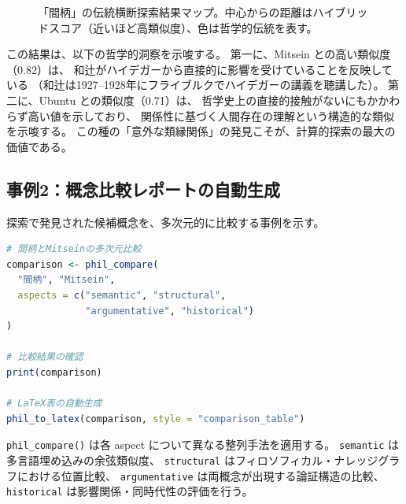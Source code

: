 \documentclass[a4paper,11pt]{ltjsarticle}
\begin{document}
\begin{figure}[H]
\caption{「間柄」の伝統横断探索結果マップ。中心からの距離はハイブリッドスコア（近いほど高類似度）、色は哲学的伝統を表す。}
\label{fig:tradition-map}
\end{figure}

この結果は、以下の哲学的洞察を示唆する。
第一に、Mitsein との高い類似度（0.82）は、
和辻がハイデガーから直接的に影響を受けていることを反映している
（和辻は1927--1928年にフライブルクでハイデガーの講義を聴講した）。
第二に、Ubuntu との類似度（0.71）は、
哲学史上の直接的接触がないにもかかわらず高い値を示しており、
関係性に基づく人間存在の理解という構造的な類似を示唆する。
この種の「意外な類縁関係」の発見こそが、計算的探索の最大の価値である。

\subsection{事例2：概念比較レポートの自動生成}\label{sec:case2}

探索で発見された候補概念を、多次元的に比較する事例を示す。

\begin{lstlisting}[language=R,caption=概念比較レポートの自動生成]
# 間柄とMitseinの多次元比較
comparison <- phil_compare(
  "間柄", "Mitsein",
  aspects = c("semantic", "structural",
              "argumentative", "historical")
)

# 比較結果の確認
print(comparison)

# LaTeX表の自動生成
phil_to_latex(comparison, style = "comparison_table")
\end{lstlisting}

\texttt{phil\_compare()} は各 aspect について異なる整列手法を適用する。
\texttt{semantic} は多言語埋め込みの余弦類似度、
\texttt{structural} はフィロソフィカル・ナレッジグラフにおける位置比較、
\texttt{argumentative} は両概念が出現する論証構造の比較、
\texttt{historical} は影響関係・同時代性の評価を行う。
\end{document}
